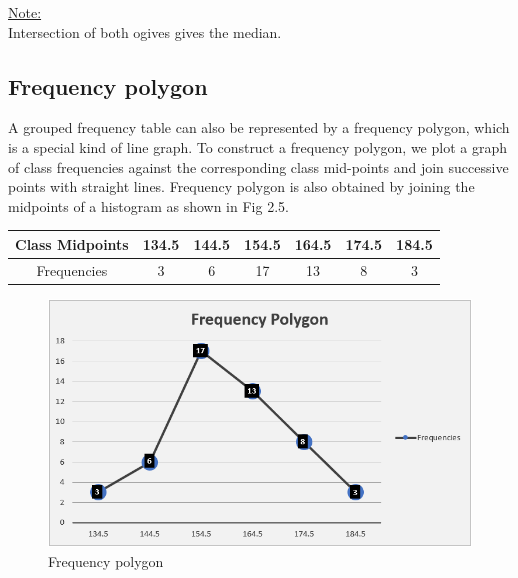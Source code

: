\documentclass[
]{book}
\begin{document}
\ul{Note:}\\
Intersection of both ogives gives the median.

\subsection{Frequency polygon}\label{frequency-polygon}

A grouped frequency table can also be represented by a frequency
polygon, which is a special kind of line graph. To construct a frequency
polygon, we plot a graph of class frequencies against the corresponding
class mid-points and join successive points with straight lines.
Frequency polygon is also obtained by joining the midpoints of a
histogram as shown in Fig 2.5.

\begin{longtable}[]{@{}ccccccc@{}}
\toprule\noalign{}
Class Midpoints & 134.5 & 144.5 & 154.5 & 164.5 & 174.5 & 184.5 \\
\midrule\noalign{}
\endhead
\bottomrule\noalign{}
\endlastfoot
Frequencies & 3 & 6 & 17 & 13 & 8 & 3 \\
\end{longtable}

\begin{figure}

{\centering \includegraphics[width=0.9\linewidth]{images/frpolygon} 

}

\caption{Frequency polygon}\label{fig:frpolygon}
\end{figure}
\end{document}
